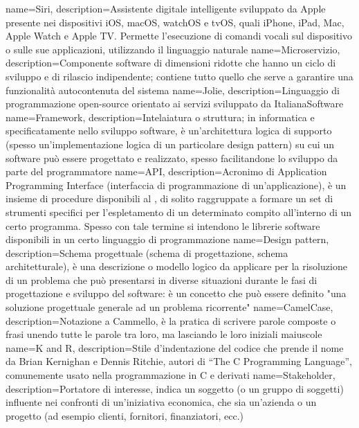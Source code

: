  {
	name=Siri,
	description={Assistente digitale intelligente sviluppato da Apple presente nei dispositivi
	iOS, macOS, watchOS e tvOS, quali iPhone, iPad, Mac, Apple Watch e Apple TV. Permette
	l'esecuzione di comandi vocali sul dispositivo o sulle sue applicazioni, utilizzando il
	linguaggio naturale}
}
 {
	name=Microservizio,
	description={Componente software di dimensioni ridotte che hanno un ciclo di sviluppo e di
	rilascio indipendente; contiene tutto quello che serve a garantire una funzionalità
	autocontenuta del sistema}
}
 {
	name=Jolie,
	description={Linguaggio di programmazione open-source orientato ai servizi sviluppato da
	ItalianaSoftware}
}
 {
	name=Framework,
	description={Intelaiatura o struttura; in informatica e specificatamente nello sviluppo software,
	è un'architettura logica di supporto (spesso un'implementazione logica di un particolare design
	pattern) su cui un software può essere progettato e realizzato, spesso facilitandone lo sviluppo
	da parte del programmatore}
}
 {
	name=API,
	description={Acronimo di Application Programming Interface (interfaccia di programmazione di
	un'applicazione), è un insieme di procedure disponibili al \programmatore, di solito
	raggruppate a formare un set di strumenti specifici per l'espletamento di un determinato
	compito all'interno di un certo programma. Spesso con tale termine si intendono le librerie
	software disponibili in un certo linguaggio di programmazione}
}
 {
	name=Design pattern,
	description={Schema progettuale (schema di progettazione, schema architetturale), è una
	descrizione o modello logico da applicare per la risoluzione di un problema che può presentarsi
	in diverse situazioni durante le fasi di progettazione e sviluppo del software: è un concetto
	che può essere definito "una soluzione progettuale generale ad un problema ricorrente"}
}
 {
	name=CamelCase,
	description={Notazione a Cammello, è la pratica di scrivere parole composte o frasi unendo tutte
	le parole tra loro, ma lasciando le loro iniziali maiuscole}
}
 {
	name=K and R,
	description={Stile d'indentazione del codice che prende il nome da Brian Kernighan e Dennis
	Ritchie, autori di ``The C Programming Language'', comunemente usato nella programmazione in
	C e derivati}
}
 {
	name=Stakeholder,
	description={Portatore di interesse, indica un soggetto (o un gruppo di soggetti) influente nei
	confronti di un'iniziativa economica, che sia un'azienda o un progetto (ad esempio clienti,
	fornitori, finanziatori, ecc.)}
}

